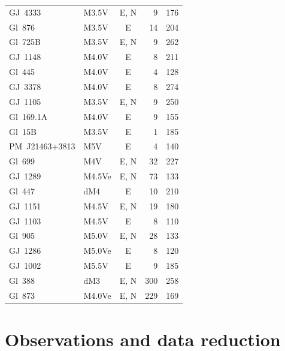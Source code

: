 \begin{table}
\begin{tabular*}{\linewidth}{@{\extracolsep{\fill}} l l c r r}
GJ~4333        & M3.5V  & E, N & 9   & 176 \\
Gl~876         & M3.5V  & E    & 14  & 204 \\
Gl~725B        & M3.5V  & E, N & 9   & 262 \\
GJ~1148        & M4.0V  & E    & 8   & 211 \\
Gl~445         & M4.0V  & E    & 4   & 128 \\
GJ~3378        & M4.0V  & E    & 8   & 274 \\
GJ~1105        & M3.5V  & E, N & 9   & 250 \\
Gl~169.1A      & M4.0V  & E    & 9   & 155 \\
Gl~15B         & M3.5V  & E    & 1   & 185 \\
PM~J21463+3813 & M5V    & E    & 4   & 140 \\
Gl~699         & M4V    & E, N & 32  & 227 \\
GJ~1289        & M4.5Ve & E, N & 73  & 133 \\
Gl~447         & dM4    & E    & 10  & 210 \\
GJ~1151        & M4.5V  & E, N & 19  & 180 \\
GJ~1103        & M4.5V  & E    & 8   & 110 \\
Gl~905         & M5.0V  & E, N & 28  & 133 \\
GJ~1286        & M5.0Ve & E    & 8   & 120 \\
GJ~1002        & M5.5V  & E    & 9   & 185 \\
Gl~388         & dM3    & E, N & 300 & 258 \\
Gl~873         & M4.0Ve & E, N & 229 & 169 \\
\bottomrule
\end{tabular*}
\end{table}

\section{Observations and data reduction}
\label{sec:observations}



